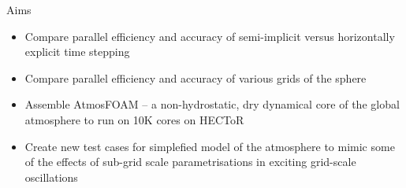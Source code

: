 \begin{slide}{Aims}

\begin{itemize}

\item Compare parallel efficiency and accuracy of semi-implicit versus horizontally explicit time stepping

\item Compare parallel efficiency and accuracy of various grids of the sphere

\item Assemble AtmosFOAM -- a non-hydrostatic, dry dynamical core of the global atmosphere to run on 10K cores on HECToR

\item Create new test cases for simplefied model of the atmosphere to mimic some of the effects of sub-grid scale parametrisations in exciting grid-scale oscillations

\end{itemize}

\end{slide}

